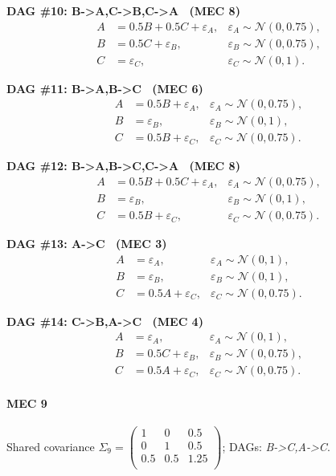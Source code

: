 \documentclass[11pt]{article}
\begin{document}
\noindent\textbf{DAG \#10: B->A,C->B,C->A \ (MEC 8)}
\begin{align*}
A &= 0.5 B + 0.5 C + \varepsilon_A, & \varepsilon_A \sim \mathcal{N}(0, 0.75),\\B &= 0.5 C + \varepsilon_B, & \varepsilon_B \sim \mathcal{N}(0, 0.75),\\C &= \varepsilon_C, & \varepsilon_C \sim \mathcal{N}(0, 1).
\end{align*}

\noindent\textbf{DAG \#11: B->A,B->C \ (MEC 6)}
\begin{align*}
A &= 0.5 B + \varepsilon_A, & \varepsilon_A \sim \mathcal{N}(0, 0.75),\\B &= \varepsilon_B, & \varepsilon_B \sim \mathcal{N}(0, 1),\\C &= 0.5 B + \varepsilon_C, & \varepsilon_C \sim \mathcal{N}(0, 0.75).
\end{align*}

\noindent\textbf{DAG \#12: B->A,B->C,C->A \ (MEC 8)}
\begin{align*}
A &= 0.5 B + 0.5 C + \varepsilon_A, & \varepsilon_A \sim \mathcal{N}(0, 0.75),\\B &= \varepsilon_B, & \varepsilon_B \sim \mathcal{N}(0, 1),\\C &= 0.5 B + \varepsilon_C, & \varepsilon_C \sim \mathcal{N}(0, 0.75).
\end{align*}

\noindent\textbf{DAG \#13: A->C \ (MEC 3)}
\begin{align*}
A &= \varepsilon_A, & \varepsilon_A \sim \mathcal{N}(0, 1),\\B &= \varepsilon_B, & \varepsilon_B \sim \mathcal{N}(0, 1),\\C &= 0.5 A + \varepsilon_C, & \varepsilon_C \sim \mathcal{N}(0, 0.75).
\end{align*}

\noindent\textbf{DAG \#14: C->B,A->C \ (MEC 4)}
\begin{align*}
A &= \varepsilon_A, & \varepsilon_A \sim \mathcal{N}(0, 1),\\B &= 0.5 C + \varepsilon_B, & \varepsilon_B \sim \mathcal{N}(0, 0.75),\\C &= 0.5 A + \varepsilon_C, & \varepsilon_C \sim \mathcal{N}(0, 0.75).
\end{align*}

\paragraph{MEC 9} Shared covariance \(\Sigma_9=\begin{pmatrix}1 & 0 & 0.5 \\0 & 1 & 0.5 \\0.5 & 0.5 & 1.25 \\\end{pmatrix}\); DAGs: \emph{B->C,A->C}.
\end{document}
